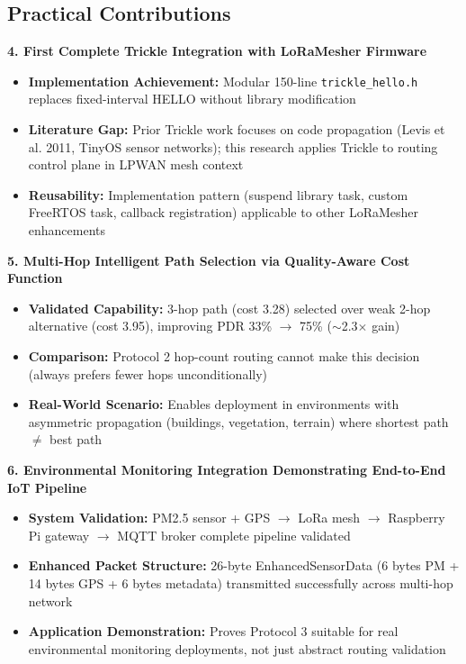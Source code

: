 \subsection{Practical Contributions}

\textbf{4. First Complete Trickle Integration with LoRaMesher Firmware}
\begin{itemize}
\item \textbf{Implementation Achievement:} Modular 150-line \texttt{trickle\_hello.h} replaces fixed-interval HELLO without library modification
\item \textbf{Literature Gap:} Prior Trickle work focuses on code propagation (Levis et al. 2011, TinyOS sensor networks); this research applies Trickle to routing control plane in LPWAN mesh context
\item \textbf{Reusability:} Implementation pattern (suspend library task, custom FreeRTOS task, callback registration) applicable to other LoRaMesher enhancements
\end{itemize}

\textbf{5. Multi-Hop Intelligent Path Selection via Quality-Aware Cost Function}
\begin{itemize}
\item \textbf{Validated Capability:} 3-hop path (cost 3.28) selected over weak 2-hop alternative (cost 3.95), improving PDR 33\% $\rightarrow$ 75\% ($\sim$2.3$\times$ gain)
\item \textbf{Comparison:} Protocol 2 hop-count routing cannot make this decision (always prefers fewer hops unconditionally)
\item \textbf{Real-World Scenario:} Enables deployment in environments with asymmetric propagation (buildings, vegetation, terrain) where shortest path $\neq$ best path
\end{itemize}

\textbf{6. Environmental Monitoring Integration Demonstrating End-to-End IoT Pipeline}
\begin{itemize}
\item \textbf{System Validation:} PM2.5 sensor + GPS $\rightarrow$ LoRa mesh $\rightarrow$ Raspberry Pi gateway $\rightarrow$ MQTT broker complete pipeline validated
\item \textbf{Enhanced Packet Structure:} 26-byte EnhancedSensorData (6 bytes PM + 14 bytes GPS + 6 bytes metadata) transmitted successfully across multi-hop network
\item \textbf{Application Demonstration:} Proves Protocol 3 suitable for real environmental monitoring deployments, not just abstract routing validation
\end{itemize}

